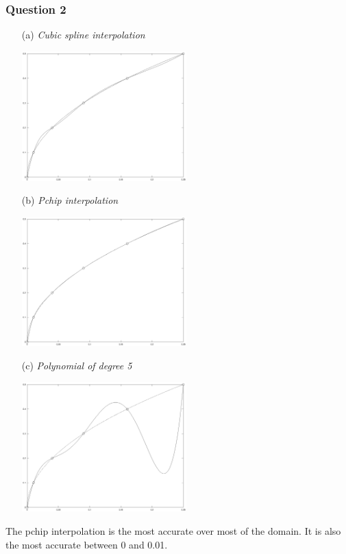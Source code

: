 \documentclass[11pt,a4paper]{article}
\begin{document}
\pagebreak

\subsubsection*{Question 2}
\begin{enumerate}
	\item[(a)] \textit{Cubic spline interpolation}
	\begin{center}
		\includegraphics[width=0.5\textwidth]{cubicspline.eps}
	\end{center}
	\item[(b)] \textit{Pchip interpolation}
	\begin{center}
		\includegraphics[width=0.5\textwidth]{pchip.eps}
	\end{center}

	\item[(c)] \textit{Polynomial of degree 5}
	\begin{center}
		\includegraphics[width=0.5\textwidth]{poly5.eps}
	\end{center}
\end{enumerate}
The pchip interpolation is the most accurate over most of the domain. It is also the most accurate between 0 and 0.01.
\end{document}
